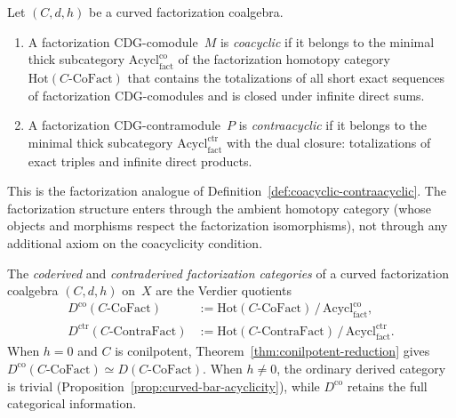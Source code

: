 \begin{definition}
\label{def:coacyclic-fact}
Let $(C, d, h)$ be a curved factorization coalgebra.
\begin{enumerate}[label=\textup{(\roman*)}]
\item A factorization CDG-comodule~$M$ is \emph{coacyclic} if it
  belongs to the minimal thick subcategory
  $\mathrm{Acycl}^{\mathrm{co}}_{\mathrm{fact}}$
  of the factorization homotopy category
  $\mathrm{Hot}(C\text{-}\mathrm{CoFact})$
  that contains the totalizations of all short exact sequences of
  factorization CDG-comodules and is closed under
  infinite direct sums.
\item A factorization CDG-contramodule~$P$ is
  \emph{contraacyclic} if it belongs to the minimal thick
  subcategory
  $\mathrm{Acycl}^{\mathrm{ctr}}_{\mathrm{fact}}$
  with the dual closure: totalizations of exact triples and
  infinite direct products.
\end{enumerate}
This is the factorization analogue of
Definition~\ref{def:coacyclic-contraacyclic}.  The factorization
structure enters through the ambient homotopy category (whose
objects and morphisms respect the factorization isomorphisms), not
through any additional axiom on the coacyclicity condition.
\end{definition}

\begin{definition}
\label{def:coderived-fact}
The \emph{coderived} and \emph{contraderived factorization
categories} of a curved factorization coalgebra $(C, d, h)$
on~$X$ are the Verdier quotients
\begin{align}
D^{\mathrm{co}}(C\text{-}\mathrm{CoFact})
  &:= \mathrm{Hot}(C\text{-}\mathrm{CoFact})
  \,\big/\, \mathrm{Acycl}^{\mathrm{co}}_{\mathrm{fact}},
  \label{eq:coderived-fact}\\
D^{\mathrm{ctr}}(C\text{-}\mathrm{ContraFact})
  &:= \mathrm{Hot}(C\text{-}\mathrm{ContraFact})
  \,\big/\, \mathrm{Acycl}^{\mathrm{ctr}}_{\mathrm{fact}}.
  \label{eq:contraderived-fact}
\end{align}
When $h = 0$ and $C$ is conilpotent,
Theorem~\ref{thm:conilpotent-reduction} gives
$D^{\mathrm{co}}(C\text{-}\mathrm{CoFact})
\simeq D(C\text{-}\mathrm{CoFact})$.
When $h \neq 0$, the ordinary derived category is trivial
(Proposition~\ref{prop:curved-bar-acyclicity}), while
$D^{\mathrm{co}}$ retains the full categorical information.
\end{definition}

